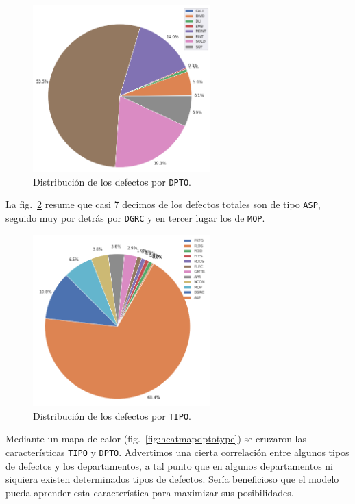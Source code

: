 \documentclass[a4paper,12pt]{article}
\begin{document}
		\begin{figure}[H]
			\begin{center}				
				\includegraphics[width=0.61\textwidth]{tesis_53.png}
				\caption{Distribución de los defectos por \texttt{DPTO}.}
				\label{fig:distgvddpto}
			\end{center}
		\end{figure}
				
		La fig.~\ref{fig:distgvdtype} resume que casi 7 decimos de los defectos totales son de tipo \texttt{ASP}, seguido muy por detrás por \texttt{DGRC} y en tercer lugar los de \texttt{MOP}.
				
		\begin{figure}[H]
			\begin{center}				
				\includegraphics[width=0.61\textwidth]{tesis_55.png}
				\caption{Distribución de los defectos por \texttt{TIPO}.}
				\label{fig:distgvdtype}
			\end{center}
		\end{figure}
				
		Mediante un mapa de calor (fig.~\ref{fig:heatmapdptotype}) se cruzaron las características \texttt{TIPO} y \texttt{DPTO}. Advertimos una cierta correlación entre algunos tipos de defectos y los departamentos, a tal punto que en algunos departamentos ni siquiera existen determinados tipos de defectos. Sería beneficioso que el modelo pueda aprender esta característica para maximizar sus posibilidades.
				
\end{document}
